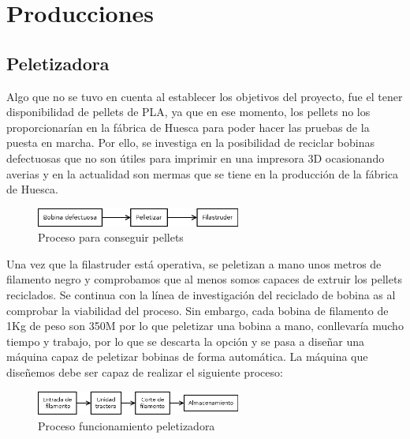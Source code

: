 \section{Producciones}
\label{sec:producciones}

\subsection{Peletizadora}
\label{sec:peletizadora}

Algo que no se tuvo en cuenta al establecer los objetivos del proyecto, fue el tener disponibilidad de pellets de PLA, ya que en ese momento, los pellets no los proporcionarían en la fábrica de Huesca para poder hacer las pruebas de la puesta en marcha. Por ello, se investiga en la posibilidad de reciclar bobinas defectuosas que no son útiles para imprimir en una impresora 3D ocasionando averias y en la actualidad son mermas que se tiene en la producción de la fábrica de Huesca.

    \begin{figure}[H]
            \centering
            \includegraphics[width=0.6\textwidth]{images/peletizadora/Diagram.png}
            \caption{Proceso para conseguir pellets}
            \label{fig:peletizadora_diagram}
    \end{figure}

Una vez que la filastruder está operativa, se peletizan a mano unos metros de filamento negro y comprobamos que al menos somos capaces de extruir los pellets reciclados. Se continua con la línea de investigación del reciclado de bobina as al comprobar la viabilidad del proceso. Sin embargo, cada bobina de filamento de 1Kg de peso son 350M por lo que peletizar una bobina a mano, conllevaría mucho tiempo y trabajo, por lo que se descarta la opción y se pasa a diseñar una máquina capaz de peletizar bobinas de forma automática. La máquina que diseñemos debe ser capaz de realizar el siguiente proceso:

    \begin{figure}[H]
            \centering
            \includegraphics[width=0.6\textwidth]{images/peletizadora/Diagram2.png}
            \caption{Proceso funcionamiento peletizadora}
            \label{fig:peletizadora_diagram2}
    \end{figure}

